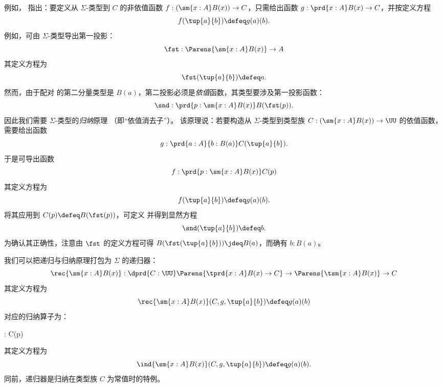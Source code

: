 例如，%
指出：要定义从 $\Sigma$-类型到 $C$ 的非依值函数
$f : (\sm{x:A} B(x)) \to C$，只需给出函数
$g : \prd{x:A} B(x) \to C$，并按定义方程
\[ f(\tup{a}{b}) \defeq g(a)(b). \]
%
例如，可由 $\Sigma$-类型导出第一投影：
%
\begin{equation*}
  \fst : \Parens{\sm{x : A}B(x)} \to A
\end{equation*}
其定义方程为
\begin{equation*}
  \fst(\tup{a}{b}) \defeq a.
\end{equation*}
然而，由于配对
的第二分量类型是 $B(a)$，第二投影必须是\emph{依值}函数，其类型要涉及第一投影函数：
%
\[ \snd : \prd{p:\sm{x : A}B(x)}B(\fst(p)). \]
因此我们需要 $\Sigma$-类型的\emph{归纳}原理%
（即“依值消去子”）。
该原理说：若要构造从 $\Sigma$-类型到类型族 $C : (\sm{x:A} B(x)) \to \UU$ 的依值函数，需要给出函数
\[ g : \prd{a:A}{b:B(a)} C(\tup{a}{b}). \]
于是可导出函数
\[ f : \prd{p : \sm{x:A}B(x)} C(p) \]
其定义方程为
\[ f(\tup{a}{b}) \defeq g(a)(b).\]
将其应用到 $C(p)\defeq B(\fst(p))$，可定义
并得到显然方程
\[ \snd(\tup{a}{b})  \defeq  b. \]
为确认其正确性，注意由 $\fst$ 的定义方程可得 $B (\fst(\tup{a}{b})) \jdeq B(a)$，而确有 $b : B(a)$。

我们可以把递归与归纳原理打包为 $\Sigma$ 的递归器：
%
\[ \rec{\sm{x:A}B(x)} : \dprd{C:\UU}\Parens{\tprd{x:A} B(x) \to C} \to
\Parens{\tsm{x:A}B(x)} \to C \]
其定义方程为
\[ \rec{\sm{x:A}B(x)}(C,g,\tup{a}{b}) \defeq g(a)(b) \]
对应的归纳算子为：
%
\begin{narrowmultline*}
   : \narrowbreak
    \to {} C(p)
\end{narrowmultline*}
其定义方程为
\[ \ind{\sm{x:A}B(x)}(C,g,\tup{a}{b}) \defeq g(a)(b). \]
同前，递归器是归纳在类型族 $C$ 为常值时的特例。

